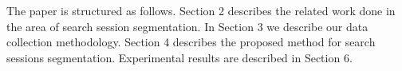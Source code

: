 \documentclass{acm_proc_article-sp} %
\begin{document}
The paper is structured as follows. Section 2 describes the
related work done in the area of search session segmentation.
In Section 3 we describe our data collection methodology.
Section 4 describes the proposed method for search
sessions segmentation. Experimental results are described
in Section 6.



\balancecolumns
\end{document}
